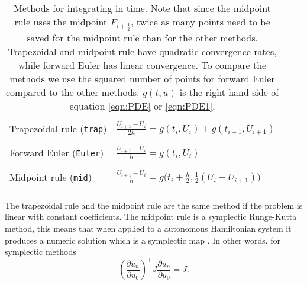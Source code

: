 \begin{table}

\caption{Methods for integrating in time. Note that since the midpoint rule uses the midpoint $F_{i+\frac{1}{2}}$, twice as many points need to be saved for the midpoint rule than for the other methods. Trapezoidal and midpoint rule have quadratic convergence rates, while forward Euler has linear convergence. To compare the methods we use the squared number of points for forward Euler compared to the other methods. $g(t,u)$ is the right hand side of equation \eqref{eqn:PDE} or \eqref{eqn:PDE1}.}
\centering
\begin{tabular}{l l}
	Trapezoidal rule (\texttt{trap}) \cite{trapezoidal} & $ \frac{U_{i+1} - U_{i}}{2h} =  g(t_i,U_i) + g(t_{i+1},U_{i+1}) $ \\
	\\
\hline	
\\
	Forward Euler (\texttt{Euler}) \cite{forwardeuler} & $ \frac{U_{i+1} - U_{i}}{h} = g ( t_i, U_i ) $ \\ %
	\\
	\hline
	\\
	Midpoint rule (\texttt{mid}) \cite{midpoint} & $ \frac{U_{i+1} - U_{i}}{h} =  g \Big(  t_{i}+\frac{h}{2} , \frac{1}{2}(U_i + U_{i+1})    \Big) $ \\%
	\\
    
    
\end{tabular}


\label{tab:intmet}
\end{table}
\noindent The trapezoidal rule and the midpoint rule are the same method if the problem is linear with constant coefficients. The midpoint rule is a symplectic Runge-Kutta method, this means that when applied to a autonomous Hamiltonian system it produces a numeric solution which is a symplectic map \cite{symplecticintegrator}. In other words, for symplectic methods
\begin{equation}
\left( \frac{\partial u_n}{\partial u_0 }  \right)^\top J  \frac{\partial u_n}{\partial u_0 } = J.
\end{equation}
